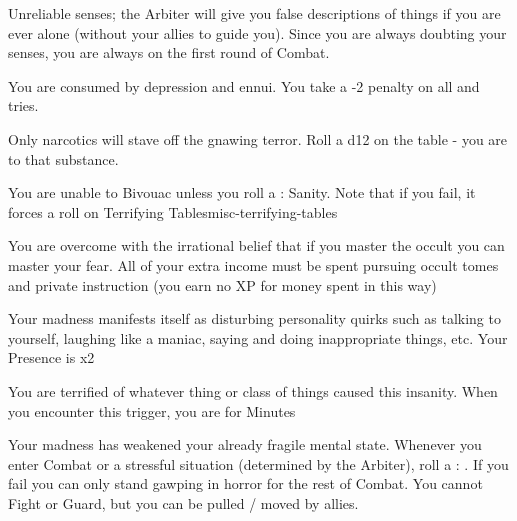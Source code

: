 {  

  Unreliable senses; the Arbiter will give you false descriptions of things if you are ever alone (without your allies to guide you). Since you are always doubting your senses, you are always  on the first round of Combat.


  You are consumed by depression and ennui. You take a -2 penalty on all \RO and \RB tries.


  Only narcotics will stave off the gnawing terror. Roll a d12 on the  table - you are  to that substance.


  You are unable to Bivouac unless you roll a \RS : Sanity.  Note that if you fail, it forces a roll on {Terrifying Tables}{misc-terrifying-tables}


  You are overcome with the irrational belief that if you master the occult you can master your fear. All of your extra income must be spent pursuing occult tomes and private instruction (you earn no XP for money spent in this way)


  Your madness manifests itself as disturbing personality quirks such as talking to yourself, laughing like a maniac, saying and doing inappropriate things, etc. Your \MAX Presence is \DCDOWN x2 


  You are terrified of whatever thing or class of things caused this insanity.  When you encounter this trigger, you are  for Minutes


  Your madness has weakened your already fragile mental state.  Whenever you enter Combat or a stressful situation (determined by the Arbiter), roll a \RS : \INT.  If you fail you can only stand gawping in horror for the rest of Combat.  You cannot Fight or Guard, but you can be pulled / moved by allies.

}
